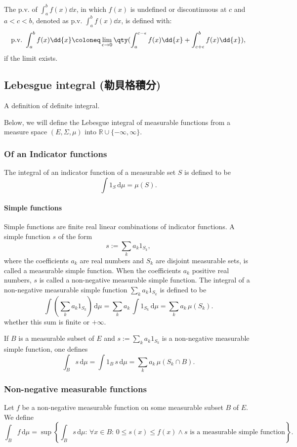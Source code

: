 \documentclass[a4paper,12pt]{report}
\begin{document}
The p.v. of $\int _{a}^{b}f(x)\dd{x}$, in which $f(x)$ is undefined or discontinuous at $c$ and $a<c<b$, denoted as $\text{p.v.\ }\int_{a}^{b} f(x)\dd{x}$, is defined with:
\[\text{p.v.\ }\int_{a}^{b} f(x)\dd{x}\coloneq\lim_{\epsilon\to 0}\qty(\int_a^{c-\epsilon}f(x)\dd{x}+\int_{c+\epsilon}^bf(x)\dd{x}),\]
if the limit exists.
\subsection{Lebesgue integral (勒貝格積分)}
A definition of definite integral.

Below, we will define the Lebesgue integral of measurable functions from a measure space $(E,\Sigma,\mu)$ into $\mathbb{R}\cup\{-\infty,\infty\}$.
\subsubsection{Of an Indicator functions}
The integral of an indicator function of a measurable set $S$ is defined to be
\[\int 1_{S}\,\mathrm{d}{\mu} =\mu (S).\]
\paragraph{Simple functions}
Simple functions are finite real linear combinations of indicator functions. A simple function $s$ of the form
\[s:=\sum_ka_k1_{S_k},\]
where the coefficients $a_k$ are real numbers and $S_k$ are disjoint measurable sets, is called a measurable simple function. When the coefficients $a_k$ positive real numbers, $s$ is called a non-negative measurable simple function. The integral of a non-negative measurable simple function $\sum_ka_k1_{S_k}$ is defined to be
\[\int\left(\sum_ka_k1_{S_k}\right)\,\mathrm{d}\mu=\sum_ka_k\,\int 1_{S_k}\,\mathrm{d}\mu=\sum_ka_k\,\mu(S_k).\]
whether this sum is finite or $+\infty$.

If $B$ is a measurable subset of $E$ and $s:=\sum_ka_k1_{S_k}$ is a non-negative measurable simple function, one defines
\[\int_Bs\,\mathrm{d}\mu=\int 1_{B}\,s\,\mathrm {d} \mu =\sum _{k}a_{k}\,\mu (S_{k}\cap B).\]
\subsubsection{Non-negative measurable functions}
Let $f$ be a non-negative measurable function on some measurable subset $B$ of $E$. We define
\[\int_Bf\,\mathrm{d}\mu=\sup\left\{\int_Bs\,\mathrm{d}\mu:\,\forall x\in B:\,0\leq s(x)\leq f(x)\land s\text{ is a measurable simple function}\right\}.\]
\end{document}
